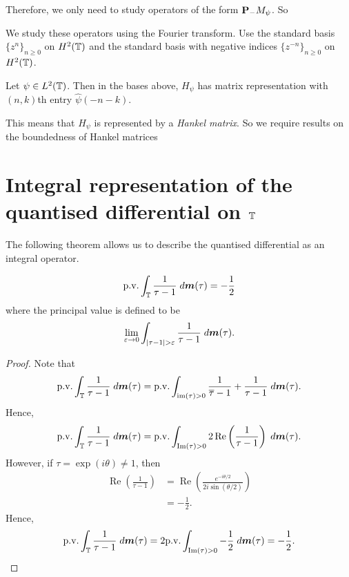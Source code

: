 Therefore, we only need to study operators of the form $\mathbf{P}_-M_\psi$. So 

We study these operators using the Fourier transform. Use the standard basis $\{z^n\}_{n\geq 0}$
on $H^2(\mathbb{T})$ and the standard basis with negative indices $\{z^{-n}\}_{n \geq 0}$ on $H^2(\mathbb{T})$.

Let $\psi \in L^2(\mathbb{T})$. Then in the bases above, $H_\psi$ has matrix representation
with $(n,k)$th entry $\hat{\psi}(-n-k)$. 

This means that $H_\psi$ is represented by a \emph{Hankel matrix}. So we require
results on the boundedness of Hankel matrices

\section{Integral representation of the quantised differential on $\mathbb{T}$}
The following theorem allows us to describe the quantised differential as an integral operator.
\begin{lemma}
\label{singularIntegral}
    \begin{equation*}
        \mathrm{p.v.}\int_{\mathbb{T}} \frac{1}{\tau-1}\;d\boldsymbol{m}(\tau) = -\frac{1}{2}
    \end{equation*}
    where the principal value is defined to be
    \begin{equation*}
        \lim_{\varepsilon\rightarrow 0} \int_{|\tau-1|>\varepsilon} \frac{1}{\tau-1}\;d\ha(\tau).
    \end{equation*}
\end{lemma} 
\begin{proof}
    Note that
    \begin{equation*}
        \mathrm{p.v.}\int_{\mathbb{T}} \frac{1}{\tau-1}\;d\boldsymbol{m}(\tau) = \mathrm{p.v.}\int_{\operatorname{im}(\tau) > 0} \frac{1}{\overline{\tau}-1}+\frac{1}{\tau-1}\;d\boldsymbol{m}(\tau).
    \end{equation*}
    Hence,
    \begin{equation*}
        \mathrm{p.v.}\int_{\mathbb{T}} \frac{1}{\tau-1}\;d\boldsymbol{m}(\tau) = \mathrm{p.v.}\int_{\operatorname{Im}(\tau)>0} 2\operatorname{Re}\left(\frac{1}{\tau-1}\right)\;d\boldsymbol{m}(\tau).
    \end{equation*}
    However, if $\tau = \exp(i\theta) \neq 1$, then
    \begin{align*}
        \operatorname{Re}\left(\frac{1}{\tau-1}\right) &= \operatorname{Re}\left(\frac{e^{-i\theta/2}}{2i\sin(\theta/2)}\right)\\
        &= -\frac{1}{2}.
    \end{align*}
    Hence,
    \begin{equation*}
        \mathrm{p.v.}\int_{\mathbb{T}} \frac{1}{\tau-1}\;d\boldsymbol{m}(\tau) = 2\mathrm{p.v.}\int_{\operatorname{Im}(\tau)>0} -\frac{1}{2}\;d\boldsymbol{m}(\tau) = -\frac{1}{2}.
    \end{equation*}
\end{proof}
